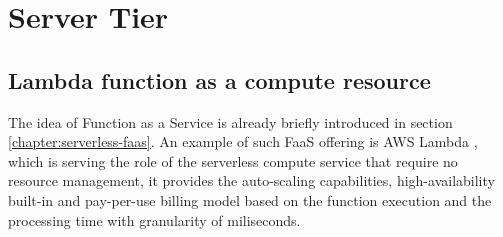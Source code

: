



\section{Server Tier}

\subsection{Lambda function as a compute resource}

The idea of Function as a Service is already briefly introduced in section \ref{chapter:serverless-faas}. 
An example of such FaaS offering is AWS Lambda \cite{AWSLambda}, which is serving the role of the serverless compute service that require no resource management, it provides the auto-scaling capabilities, high-availability built-in and pay-per-use billing model based on the function execution and the processing time with granularity of miliseconds.

